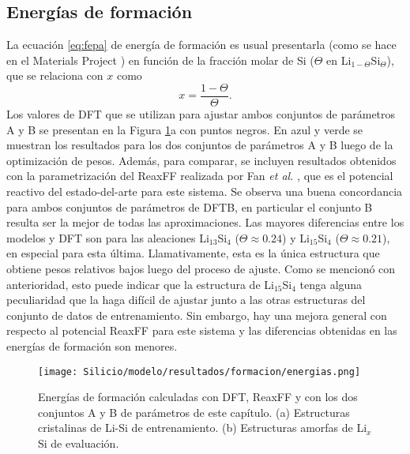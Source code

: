 \subsection{Energías de formación}

La ecuación \ref{eq:fepa} de energía de formación es usual presentarla (como
se hace en el Materials Project \cite{materials_project}) en función
de la fracción molar de Si ($\Theta$ en Li$_{1-\Theta}$Si$_\Theta$), que
se relaciona con $x$ como
\begin{equation}
	x = \frac{1 - \Theta}{\Theta}.
\end{equation}
Los valores de DFT que se utilizan para ajustar ambos conjuntos de parámetros
A y B se presentan en la Figura \ref{fig:eform}a con puntos negros. En azul
y verde se muestran los resultados para los dos conjuntos de parámetros A y B
luego de la optimización de pesos. Además, para comparar, se incluyen resultados
obtenidos con la parametrización del ReaxFF realizada por Fan \textit{et al.}
\cite{fan2013}, que es el potencial reactivo del estado-del-arte para este
sistema. Se observa una buena concordancia para ambos conjuntos de parámetros
de DFTB, en particular el conjunto B resulta ser la mejor de todas las
aproximaciones. Las mayores diferencias entre los modelos y DFT son para las
aleaciones Li$_{13}$Si$_4$ ($\Theta \approx 0.24$) y Li$_{15}$Si$_4$
($\Theta \approx 0.21$), en especial para esta última. Llamativamente, esta es
la única estructura que obtiene pesos relativos bajos luego del proceso de
ajuste. Como se mencionó con anterioridad, esto puede indicar que la estructura
de Li$_{15}$Si$_4$ tenga alguna peculiaridad que la haga difícil de ajustar
junto a las otras estructuras del conjunto de datos de entrenamiento. Sin
embargo, hay una mejora general con respecto al potencial ReaxFF para este
sistema y las diferencias obtenidas en las energías de formación son menores.

\begin{figure}[h]
	\centering
	\texttt{[image: Silicio/modelo/resultados/formacion/energias.png]}
	\caption{Energías de formación calculadas con DFT, ReaxFF y con los dos
	conjuntos A y B de parámetros de este capítulo. (a) Estructuras cristalinas
	de Li-Si de entrenamiento. (b) Estructuras amorfas de Li$_x$Si de evaluación.}
	\label{fig:eform}
\end{figure}

